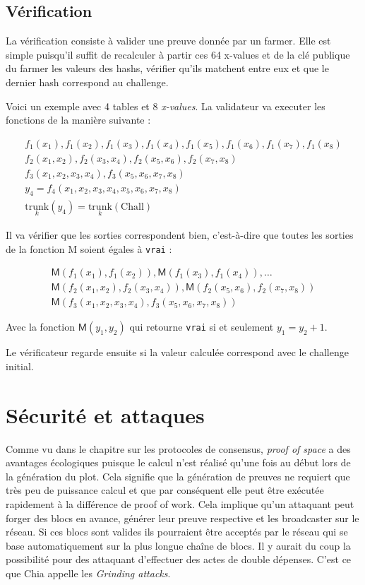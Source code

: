 \subsection{Vérification}

La vérification consiste à valider une preuve donnée par un farmer. Elle est simple puisqu'il suffit de recalculer à partir ces 64 x-values et de la clé publique du farmer les valeurs des hashs, vérifier qu'ils matchent entre eux et que le dernier hash correspond au challenge.

Voici un exemple avec 4 tables et 8 \emph{x-values}. La validateur va executer les fonctions de la manière suivante :

\begin{gather*}
  f_1(x_1), f_1(x_2), f_1(x_3), f_1(x_4), f_1(x_5), f_1(x_6), f_1(x_7), f_1(x_8) \\
  f_2(x_1,x_2), f_2(x_3,x_4), f_2(x_5,x_6), f_2(x_7,x_8) \\
  f_3(x_1,x_2,x_3,x_4), f_3(x_5,x_6,x_7,x_8) \\
  y_4 = f_4(x_1,x_2,x_3,x_4,x_5,x_6,x_7,x_8) \\
  \underset{k}{\mathrm{trunk}}(y_4)=\underset{k}{\mathrm{trunk}}(\mathrm{Chall})
\end{gather*}

Il va vérifier que les sorties correspondent bien, c'est-à-dire que toutes les sorties de la fonction \textsf{M} soient égales à \texttt{vrai} :

\begin{gather*}
  \mathsf{M}(f_1(x_1), f_1(x_2)),\mathsf{M}(f_1(x_3), f_1(x_4)),\dots \\
  \mathsf{M}(f_2(x_1,x_2),f_2(x_3,x_4)),\mathsf{M}(f_2(x_5,x_6),f_2(x_7,x_8)) \\
  \mathsf{M}(f_3(x_1,x_2,x_3,x_4), f_3(x_5,x_6,x_7,x_8))
\end{gather*}

Avec la fonction $\mathsf{M}(y_1,y_2)$ qui retourne \texttt{vrai} si et seulement $y_1 = y_2 + 1$.

Le vérificateur regarde ensuite si la valeur calculée correspond avec le challenge initial.

\section{Sécurité et attaques}
\label{pospace:security}

Comme vu dans le chapitre sur les protocoles de consensus, \emph{proof of space} a des avantages écologiques puisque le calcul n'est réalisé qu'une fois au début lors de la génération du plot. Cela signifie que la génération de preuves ne requiert que très peu de puissance calcul et que par conséquent elle peut être exécutée rapidement à la différence de proof of work. Cela implique qu'un attaquant peut forger des blocs en avance, générer leur preuve respective et les broadcaster sur le réseau. Si ces blocs sont valides ils pourraient être acceptés par le réseau qui se base automatiquement sur la plus longue chaîne de blocs. Il y aurait du coup la possibilité pour des attaquant d'effectuer des actes de double dépenses. C'est ce que Chia appelle les \emph{Grinding attacks}.

